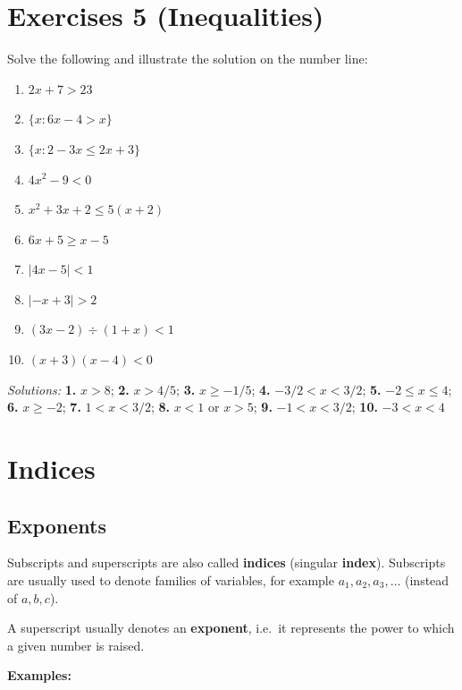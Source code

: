 \documentclass[
  12pt,
  oneside]{book}
\theoremstyle{definition}
\theoremstyle{definition}
\theoremstyle{definition}
\theoremstyle{definition}
\theoremstyle{remark}
\begin{document}
\hypertarget{exercises-5-inequalities}{%
\chapter*{Exercises 5 (Inequalities)}\label{exercises-5-inequalities}}

Solve the following and illustrate the solution on the number line:

\begin{enumerate}
\def\labelenumi{\arabic{enumi}.}
\item
  \(2x+7>23\)
\item
  \(\{x: 6x-4>x\}\)
\item
  \(\{x: 2-3x \leq 2x+3\}\)
\item
  \(4x^2-9<0\)
\item
  \(x^2+3x+2\leq 5(x+2)\)
\item
  \(6x+5\geq x-5\)
\item
  \(|4x-5|<1\)
\item
  \(|-x+3|>2\)
\item
  \((3x-2)\div(1+x)<1\)
\item
  \((x+3)(x-4)<0\)
\end{enumerate}

\emph{Solutions:}
\textbf{1.} \(x>8\);
\textbf{2.} \(x>4/5\);
\textbf{3.} \(x\geq-1/5\);
\textbf{4.} \(-3/2< x< 3/2\);
\textbf{5.} \(-2\leq x\leq4\);
\textbf{6.} \(x\geq-2\);
\textbf{7.} \(1<x<3/2\);
\textbf{8.} \(x<1\) or \(x>5\);
\textbf{9.} \(-1<x<3/2\);
\textbf{10.} \(-3<x<4\)

\hypertarget{indices}{%
\chapter{Indices}\label{indices}}

\hypertarget{exponents}{%
\section{Exponents}\label{exponents}}

Subscripts and superscripts are also called \textbf{indices} (singular \textbf{index}). Subscripts are usually used to denote families of variables, for example \(a_1,a_2,a_3,\dots\) (instead of \(a,b,c\)).

A superscript usually denotes an \textbf{exponent}, i.e.~it represents the power to which a given number is raised.

\textbf{Examples:}
\end{document}
